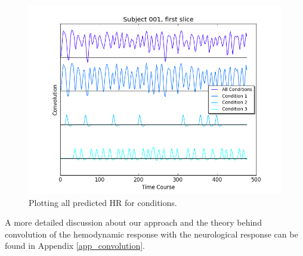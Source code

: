\begin{figure}[ht]
\centering
\includegraphics[scale=.5]{../images/all_cond_time}  
\caption{Plotting all predicted HR for conditions.}
\label{fig:all_cond_time}
\end{figure}

A more detailed discussion about our approach and the theory behind convolution 
of the hemodynamic response with the neurological response can be found 
in Appendix \ref{app_convolution}.

